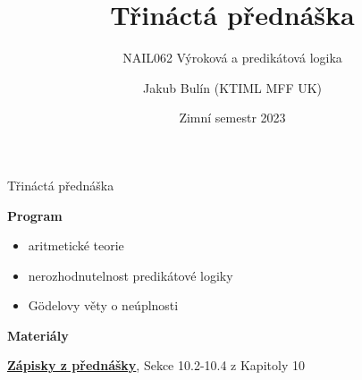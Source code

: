 \documentclass{beamer}
\title{Třináctá přednáška}
\subtitle{NAIL062 Výroková a predikátová logika}
\author{Jakub Bulín (KTIML MFF UK)}
\date{Zimní semestr 2023}
\begin{document}
\frame{\titlepage}


\begin{frame}{Třináctá přednáška}

    \textbf{Program}
        \begin{itemize}
            \item aritmetické teorie
            \item nerozhodnutelnost predikátové logiky
            \item Gödelovy věty o neúplnosti
        \end{itemize}      
    
    \textbf{Materiály}

        \href{https://github.com/jbulin-mff-uk/nail062/raw/main/lecture/lecture-notes/lecture-notes.pdf}{\alert{\textbf{Zápisky z přednášky}}}, Sekce 10.2-10.4 z Kapitoly 10

\end{frame}
\end{document}
